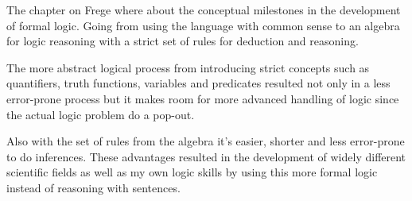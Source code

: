 \documentclass{article}
\begin{document}

    The chapter on Frege where about the conceptual milestones in the development of
    formal logic. Going from using the language with common sense to an algebra for 
    logic reasoning with a strict set of rules for deduction and reasoning. 
    
    The more abstract logical process from introducing strict concepts
    such as quantifiers, truth functions, variables and
    predicates resulted not only in a less error-prone process but it makes 
    room for more advanced handling of logic since the actual logic problem do
    a pop-out.
    
    Also with the set of rules from the algebra it's easier, shorter and less
    error-prone to do inferences.
    These advantages resulted in the development of widely different
    scientific fields as well as my own logic skills by using this more 
    formal logic instead of reasoning with sentences.
\end{document}
